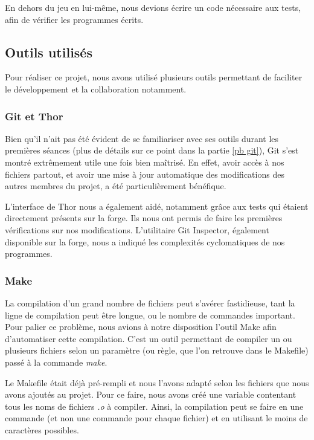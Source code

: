 \documentclass[a4paper]{article}
\begin{document}
En dehors du jeu en lui-même, nous devions écrire un code nécessaire aux tests, afin de vérifier les programmes écrits.

\subsection{Outils utilisés}
\label{outils}
Pour réaliser ce projet, nous avons utilisé plusieurs outils permettant de faciliter le développement et la collaboration notamment.

\subsubsection{Git et Thor}
\label{git}
Bien qu'il n'ait pas été évident de se familiariser avec ses outils durant les premières séances (plus de détails sur ce point dans la partie \ref{pb git}), Git s'est montré extrêmement utile une fois bien maîtrisé. En effet, avoir accès à nos fichiers partout, et avoir une mise à jour automatique des modifications des autres membres du projet, a été particulièrement bénéfique.

L'interface de Thor nous a également aidé, notamment grâce aux tests qui étaient directement présents sur la forge. Ils nous ont permis de faire les premières vérifications sur nos modifications. L'utilitaire Git Inspector, également disponible sur la forge, nous a indiqué les complexités cyclomatiques de nos programmes. %

\subsubsection{Make}
\label{makefile}
La compilation d'un grand nombre de fichiers peut s'avérer fastidieuse, tant la ligne de compilation peut être longue, ou le nombre de commandes important. Pour palier ce problème, nous avions à notre disposition l'outil Make afin d'automatiser cette compilation. C'est un outil permettant de compiler un ou plusieurs fichiers selon un paramètre (ou règle, que l'on retrouve dans le Makefile) passé à la commande \emph{make}.

Le Makefile était déjà pré-rempli et nous l'avons adapté selon les fichiers que nous avons ajoutés au projet. Pour ce faire, nous avons créé une variable contentant tous les noms de fichiers \emph{.o} à compiler. Ainsi, la compilation peut se faire en une commande (et non une commande pour chaque fichier) et en utilisant le moins de caractères possibles.
\end{document}

